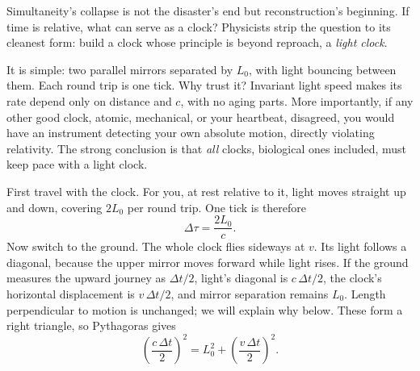 
\begin{mainline}
Simultaneity's collapse is not the disaster's end but reconstruction's beginning. If time is relative, what can serve as a clock? Physicists strip the question to its cleanest form: build a clock whose principle is beyond reproach, a \emph{light clock}.

It is simple: two parallel mirrors separated by \(L_0\), with light bouncing between them. Each round trip is one tick. Why trust it? Invariant light speed makes its rate depend only on distance and \(c\), with no aging parts. More importantly, if any other good clock, atomic, mechanical, or your heartbeat, disagreed, you would have an instrument detecting your own absolute motion, directly violating relativity. The strong conclusion is that \emph{all} clocks, biological ones included, must keep pace with a light clock.

First travel with the clock. For you, at rest relative to it, light moves straight up and down, covering \(2L_0\) per round trip. One tick is therefore
\[
\Delta\tau=\frac{2L_0}{c}.
\]
Now switch to the ground. The whole clock flies sideways at \(v\). Its light follows a diagonal, because the upper mirror moves forward while light rises. If the ground measures the upward journey as \(\Delta t/2\), light's diagonal is \(c\,\Delta t/2\), the clock's horizontal displacement is \(v\,\Delta t/2\), and mirror separation remains \(L_0\). Length perpendicular to motion is unchanged; we will explain why below. These form a right triangle, so Pythagoras gives
\[
\left(\frac{c\,\Delta t}{2}\right)^{2}=L_0^{2}+\left(\frac{v\,\Delta t}{2}\right)^{2}.
\]

\begin{center}
\end{center}


\end{mainline}
